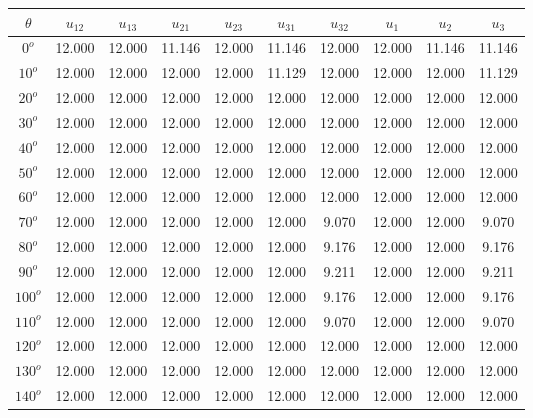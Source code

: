 	\singlespacing
	\begin{table}[H]
	    \centering
	    \begin{tabular}{|c|c|c|c|c|c|c|c|c|c|}
	    	 \hline
	    	 $\theta$ & $u_{12}$ & $u_{13}$ & $u_{21}$ & $u_{23}$ & $u_{31}$ & $u_{32}$ & $u_{1}$ & $u_{2}$ & $u_{3}$  \\
	         \hline
	         $0^{o}$ & 12.000 & 12.000 & 11.146 & 12.000 & 11.146 & 12.000 & 12.000& 11.146 & 11.146  \\
	         \hline
	         $10^{o}$ & 12.000 & 12.000 & 12.000 & 12.000 & 11.129 & 12.000 & 12.000& 12.000 & 11.129  \\
	         \hline
	         $20^{o}$ & 12.000 & 12.000 & 12.000 & 12.000 & 12.000 & 12.000 & 12.000& 12.000 & 12.000  \\
	         \hline
	         $30^{o}$ & 12.000 & 12.000 & 12.000 & 12.000 & 12.000 & 12.000 & 12.000& 12.000 & 12.000  \\
	         \hline
	         $40^{o}$ & 12.000 & 12.000 & 12.000 & 12.000 & 12.000 & 12.000 & 12.000& 12.000 & 12.000  \\
	         \hline
	         $50^{o}$ & 12.000 & 12.000 & 12.000 & 12.000 & 12.000 & 12.000 & 12.000& 12.000 & 12.000 \\
	         \hline
	         $60^{o}$ & 12.000 & 12.000 & 12.000 & 12.000 & 12.000 & 12.000 & 12.000& 12.000 & 12.000  \\
	         \hline
	         $70^{o}$ & 12.000 & 12.000 & 12.000 & 12.000 & 12.000 & 9.070 & 12.000& 12.000 & 9.070  \\
	         \hline
	         $80^{o}$ & 12.000 & 12.000 & 12.000 & 12.000 & 12.000 & 9.176 & 12.000& 12.000 & 9.176  \\
	         \hline
	         $90^{o}$ & 12.000 & 12.000 & 12.000 & 12.000 & 12.000 & 9.211 & 12.000& 12.000 & 9.211 \\
	         \hline
	         $100^{o}$ & 12.000 & 12.000 & 12.000 & 12.000 & 12.000 & 9.176 & 12.000& 12.000 & 9.176  \\
	         \hline
	         $110^{o}$ & 12.000 & 12.000 & 12.000 & 12.000 & 12.000 & 9.070 & 12.000& 12.000 & 9.070  \\
	         \hline
	         $120^{o}$ & 12.000 & 12.000 & 12.000 & 12.000 & 12.000 & 12.000 & 12.000& 12.000 & 12.000  \\
	         \hline
	         $130^{o}$ & 12.000 & 12.000 & 12.000 & 12.000 & 12.000 & 12.000 & 12.000& 12.000 & 12.000  \\
	         \hline
	         $140^{o}$ & 12.000 & 12.000 & 12.000 & 12.000 & 12.000 & 12.000 & 12.000& 12.000 & 12.000  \\

\end{tabular}
\end{table}
